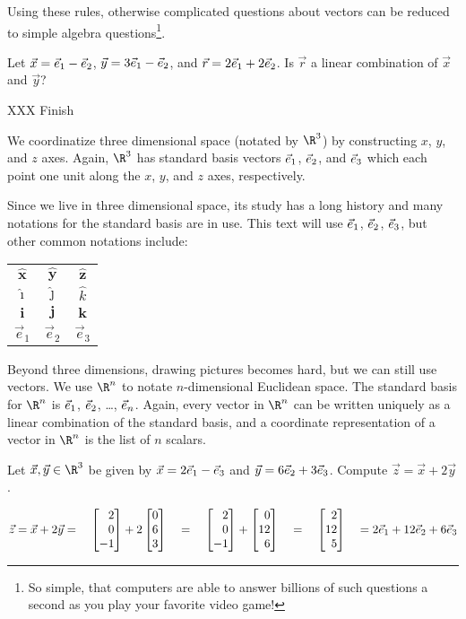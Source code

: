 Using these rules, otherwise complicated questions about vectors can be reduced
to simple algebra questions\footnote{ So simple, that computers are able to answer billions of
such questions a second as you play your favorite video game!}.

\begin{example}
	Let $\vec x={\vec e_1}-{\vec e_2}$, $\vec y=3{\vec e_1}-{\vec e_2}$, and $\vec r=2{\vec e_1}+2{\vec e_2}$. Is
	$\vec r$ a linear combination of $\vec x$ and $\vec y$?

	XXX Finish
\end{example}

We coordinatize three dimensional space (notated by $\R^3$) by constructing $x$, $y$, and $z$ axes.
Again, $\R^3$ has standard basis vectors ${\vec e_1}$, ${\vec e_2}$, and ${\vec e_3}$ which each
point one unit along the $x$, $y$, and $z$ axes, respectively.

Since we live in three dimensional space, its study has a long history and many notations
for the standard basis are in use. This text will use ${\vec e_1}$, ${\vec e_2}$, ${\vec e_3}$, but other common
notations include:
\begin{center}
	\begin{tabular}{c  c  c}
		$\hat{\mathbf{x}}$ & $\hat{\mathbf{y}}$ &$\hat{\mathbf{z}}$\\
		$\hat{\imath}$ & $\hat{\jmath}$ &$\hat{k}$\\
		$\mathbf{i}$ & $\mathbf j$ & $\mathbf k$\\
		$\vec e_1$ & $\vec e_2$ & $\vec e_3$
	\end{tabular}
\end{center}

Beyond three dimensions, drawing pictures becomes hard, but we can still use vectors.
We use $\R^n$ to notate $n$-dimensional Euclidean space. The standard basis for $\R^n$ is
$\vec { e}_{1}$, $\vec { e}_{2}$, \ldots, $\vec { e}_{n}$. Again, every vector in $\R^n$ can be written
uniquely as a linear combination of the standard basis, and a coordinate representation
of a vector in $\R^n$ is the list of $n$ scalars.

\begin{example}
	Let $\vec x,\vec y\in\R^3$ be given by $\vec x=2{\vec e_1}-{\vec e_3}$ and $\vec y=6{\vec e_2}+3{\vec e_3}$.
	Compute $\vec z=\vec x+2\vec y$.

	\[
		\vec z=\vec x+2\vec y=\quad\mat{2\\0\\-1}+2\mat{0\\6\\3}\quad
		=\quad\mat{2\\0\\-1}+\mat{0\\12\\6}\quad=\quad\mat{2\\12\\5}\quad=2\xhat+12\yhat+6\zhat
	\]
\end{example}
